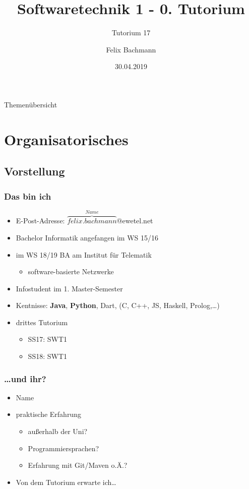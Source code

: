 \documentclass[18pt]{beamer}
\title[SWT1]{Softwaretechnik 1 - 0. Tutorium}
\subtitle{Tutorium 17}
\author{Felix Bachmann}
\date{30.04.2019}
\institute{KIT - Institut für Programmstrukturen und Datenorganisation (IPD)}
\begin{document}

\begin{frame}
\titlepage
\end{frame}

\begin{frame}{Themenübersicht}
\tableofcontents
\end{frame}

\section{Organisatorisches}
	\subsection{Vorstellung}
		\begin{frame}
			\frametitle{Das bin ich}
			\begin{itemize}
				\item E-Post-Adresse: $\overbrace{felix.bachmann}^{Name}$@ewetel.net 
				\item Bachelor Informatik angefangen im WS 15/16
				\item im WS 18/19 BA am Institut für Telematik
				\begin{itemize}
					\item software-basierte Netzwerke
				\end{itemize}
				\item Infostudent im 1. Master-Semester
				\item Kentnisse: \textbf{Java}, \textbf{Python}, Dart, (C, C++, JS, Haskell, Prolog,\dots)
				\item drittes Tutorium
				\begin{itemize}
					\item SS17: SWT1
					\item SS18: SWT1
				\end{itemize}
			\end{itemize}
		\end{frame}
		\begin{frame}
			\frametitle{\dots und ihr?}
			\begin{itemize}
				\item Name
				\item praktische Erfahrung
				\begin{itemize}
					\item außerhalb der Uni?
					\item Programmiersprachen?
					\item Erfahrung mit Git/Maven o.Ä.?
				\end{itemize}
				\item Von dem Tutorium erwarte ich\dots
			\end{itemize}
		\end{frame}
	
\end{document}
